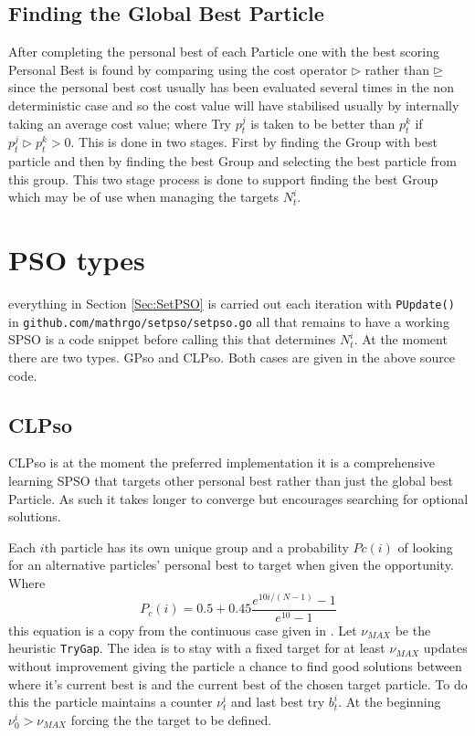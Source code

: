 \documentclass[a4paper,oneside,english]{book}
\numberwithin{equation}{section}
\numberwithin{figure}{section}
\newcommand{\codesorc}[1]{\texttt{github.com/mathrgo/setpso/#1}}
\begin{document}
\subsection{ Finding the Global Best Particle}
After completing the personal best of each Particle one with the best scoring Personal Best is found by comparing using the cost operator $\rhd$ rather than $\unrhd$ since the personal best cost usually has been evaluated several times  in the non deterministic case and so the cost value will have stabilised usually by internally taking an average cost value; where Try $p^j_t$ is taken to be better than $p^k_t$ if $p^j_t \rhd p^k_t >0$. This is done in two stages. First by finding the Group with best particle and then by finding the best Group and selecting the best particle from this group. This two stage  process is done to support finding the best Group which may be of use when managing the targets $N^i_t$.    
 
\section{PSO types}
everything in Section \ref{Sec:SetPSO} is carried out each iteration with \texttt{PUpdate() } in \codesorc{setpso.go} all that remains to have a working SPSO is a code snippet before calling this that determines $ N^i_t$.   At the moment there are two types. GPso and CLPso.  Both cases are given in the above source code.

\subsection{CLPso}
CLPso is at the moment the preferred implementation it is a comprehensive learning SPSO that targets other personal best rather than just the global best  Particle. As such it takes longer to converge but encourages searching for optional solutions.

Each $i$th particle has its own unique group and a probability $Pc(i)$ of looking for an alternative  particles' personal best to target when given the opportunity.  Where 
\begin{equation}\label{eqn:Pc(i)}
	P_c(i)=0.5+0.45\frac{e^{10i/(N-1)}-1}{e^{10}-1}
\end{equation} 
this equation is a copy from the continuous case given in \cite{comp-pso}. Let $\nu_{MAX} $ be the heuristic  \texttt{TryGap}. The idea is to stay with a fixed target  for at least $\nu_{MAX} $ updates without improvement giving the particle a chance to find good solutions between where it's current best is and the current best of the chosen target particle. To do this the particle maintains a counter $\nu^i_t$ and last best try $b^i_t$. At the beginning $\nu^i_0 >\nu_{MAX} $ forcing the the target to be defined.
\end{document}

